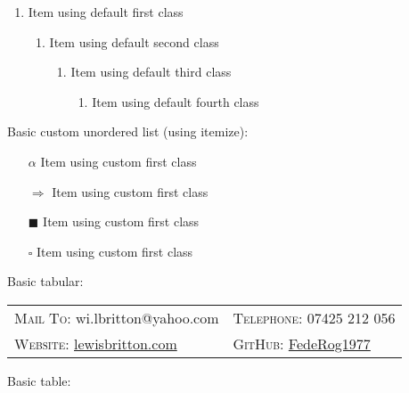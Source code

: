 \documentclass[11pt, english]{article}
\begin{document}
	\begin{enumerate}
	\setlength\itemsep{0cm}
                \item Item using default first class
                \begin{enumerate}        
                        \item Item using default second class
                        \begin{enumerate}
                                \item Item using default third class
                                \begin{enumerate}
                                        \item Item using default fourth class
                                \end{enumerate}   
                        \end{enumerate}
                \end{enumerate}
        \end{enumerate}

	Basic custom unordered list (using itemize):

	\begin{itemize}
	\setlength\itemsep{0cm}
		\item[$\alpha$] Item using custom first class
		\item[$\Longrightarrow$] Item using custom first class
		\item[$\blacksquare$] Item using custom first class
		\item[$\square$] Item using custom first class
        \end{itemize}

	\newpage

	Basic tabular:

	\begin{center}
                \small
        \begin{tabular}{p{5.45cm}|p{5.45cm}}
                \textsc{Mail To:} wi.lbritton@yahoo.com & \textsc{Telephone:} 07425 212 056\\
                \textsc{Website:} \href{http://lewisbritton.com}{lewisbritton.com} & \textsc{GitHub:} \href{https://github.com/FedeRog1977}{FedeRog1977}\\
        \end{tabular}
        \end{center}

	Basic table: 
\end{document}
